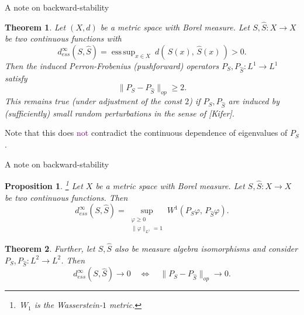\documentclass[
  english,            %
  aspectratio=169,    %
]{tumbeamer}
\newtheorem{theorem}{Theorem}
\newtheorem{proposition}{Proposition}
\newenvironment{emphbox}
  {\begin{tcolorbox}[colback=blue!5!white,colframe=blue!75!black]}
  {\end{tcolorbox}}
\renewcommand{\emph}[1]{\textcolor{purple}{#1}}
\DeclareMathOperator*{\esssup}{ess\,sup}
\begin{document}
\begin{frame}{A note on backward-stability}
  
\begin{theorem}
  Let $(X, d)$ be a metric space with Borel measure. Let $S,\hat{S} : X \to X$ be two continuous functions with 
  \begin{equation}
    d_{ess}^\infty (S, \hat{S}) = \esssup_{x \in X}\ d(\, S(x),\, \hat{S}(x)\, ) > 0 . 
  \end{equation}
  Then the induced Perron-Frobenius (pushforward) operators $P_S, P_{\hat{S}} : L^1 \to L^1$ satisfy 
  \begin{equation}
    \| P_S - P_{\hat{S}} \|_{op} \geq 2 . 
  \end{equation}
  This remains true (under adjustment of the const $2$) if $P_S, P_{\hat{S}}$ are induced by (sufficiently) small random perturbations in the sense of [Kifer]. 
\end{theorem}

\begin{emphbox}
  Note that this does \emph{not} contradict the continuous dependence of eigenvalues of $P_S$. 
\end{emphbox}

\end{frame}

\begin{frame}{A note on backward-stability}
  
\begin{proposition}
  \footnote{$\ W_1$ is the Wasserstein-$1$ metric.}
  Let $X$ be a metric space with Borel measure. Let $S,\hat{S} : X \to X$ be two continuous functions. Then 
  \begin{equation}
    d_{ess}^\infty (S, \hat{S}) %
    = \sup_{\substack{\varphi \geq 0 \\ \| \varphi \|_{L^1} = 1}} W^1 (P_{S} \varphi,\, P_{\hat{S}} \varphi) . 
  \end{equation}
\end{proposition}

\begin{theorem}  
  Further, let $S,\hat{S}$ also be measure algebra isomorphisms and consider $P_{S}, P_{\hat{S}} : L^2 \to L^2$. Then 
  \begin{equation}
    d_{ess}^\infty (S, \hat{S}) \to 0 \quad \Leftrightarrow \quad \| P_{S} - P_{\hat{S}} \|_{op} \to 0 . 
  \end{equation}
\end{theorem}

\end{frame}
\end{document}
